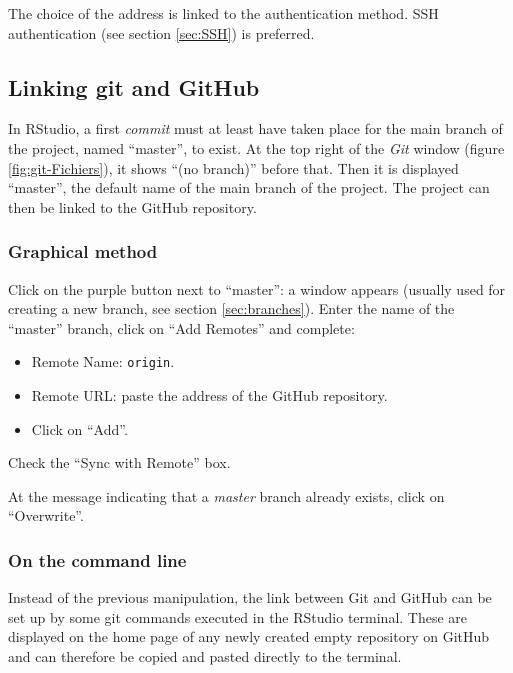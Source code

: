 \documentclass[
  12pt,
  american,
  a4paper,
  extrafontsizes,onecolumn,openright
  ]{memoir}
\providecommand{\tightlist}{%
  \setlength{\itemsep}{0pt}\setlength{\parskip}{0pt}}
\begin{document}
The choice of the address is linked to the authentication method.
SSH authentication (see section \ref{sec:SSH}) is preferred.

\hypertarget{linking-git-and-github}{%
\subsection{Linking git and GitHub}\label{linking-git-and-github}}

In RStudio, a first \emph{commit} must at least have taken place for the main branch of the project, named \enquote{master}, to exist.
At the top right of the \emph{Git} window (figure \ref{fig:git-Fichiers}), it shows \enquote{(no branch)} before that.
Then it is displayed \enquote{master}, the default name of the main branch of the project.
The project can then be linked to the GitHub repository.

\hypertarget{graphical-method}{%
\subsubsection{Graphical method}\label{graphical-method}}

Click on the purple button next to \enquote{master}: a window appears (usually used for creating a new branch, see section \ref{sec:branches}).
Enter the name of the \enquote{master} branch, click on \enquote{Add Remotes} and complete:

\begin{itemize}
\tightlist
\item
  Remote Name: \texttt{origin}.
\item
  Remote URL: paste the address of the GitHub repository.
\item
  Click on \enquote{Add}.
\end{itemize}

Check the \enquote{Sync with Remote} box.

At the message indicating that a \emph{master} branch already exists, click on \enquote{Overwrite}.

\hypertarget{on-the-command-line}{%
\subsubsection{On the command line}\label{on-the-command-line}}

Instead of the previous manipulation, the link between Git and GitHub can be set up by some git commands executed in the RStudio terminal.
These are displayed on the home page of any newly created empty repository on GitHub and can therefore be copied and pasted directly to the terminal.
\end{document}
